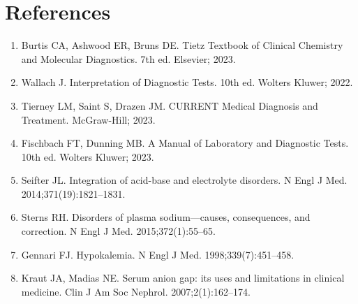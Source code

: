 \section*{References}
\begin{enumerate}
  \item Burtis CA, Ashwood ER, Bruns DE. Tietz Textbook of Clinical Chemistry and Molecular Diagnostics. 7th ed. Elsevier; 2023.
  \item Wallach J. Interpretation of Diagnostic Tests. 10th ed. Wolters Kluwer; 2022.
  \item Tierney LM, Saint S, Drazen JM. CURRENT Medical Diagnosis and Treatment. McGraw-Hill; 2023.
  \item Fischbach FT, Dunning MB. A Manual of Laboratory and Diagnostic Tests. 10th ed. Wolters Kluwer; 2023.
  \item Seifter JL. Integration of acid-base and electrolyte disorders. N Engl J Med. 2014;371(19):1821--1831.
  \item Sterns RH. Disorders of plasma sodium---causes, consequences, and correction. N Engl J Med. 2015;372(1):55--65.
  \item Gennari FJ. Hypokalemia. N Engl J Med. 1998;339(7):451--458.
  \item Kraut JA, Madias NE. Serum anion gap: its uses and limitations in clinical medicine. Clin J Am Soc Nephrol. 2007;2(1):162--174.
\end{enumerate}

\clearpage
